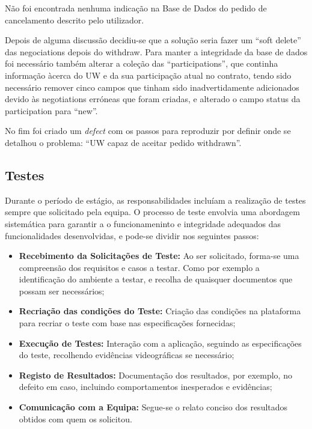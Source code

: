             Não foi encontrada nenhuma indicação na Base de Dados do pedido de cancelamento descrito pelo utilizador.

            Depois de alguma discussão decidiu-se que a solução seria fazer um ``soft delete'' das negociations depois do withdraw. Para manter a integridade da base de dados foi necessário também alterar a coleção das ``participations'', que continha informação àcerca do UW e da sua participação atual no contrato, tendo sido necessário remover cinco campos que tinham sido inadvertidamente adicionados devido às negotiations erróneas que foram criadas, e alterado o campo status da participation para ``new''.
            
            No fim foi criado um \textit{defect} com os passos para reproduzir por definir onde se detalhou o problema: ``UW capaz de aceitar pedido withdrawn''.



    \subsection{Testes}\label{sub:tests}

        Durante o período de estágio, as responsabilidades incluíam a realização de testes sempre que solicitado pela equipa. O processo de teste envolvia uma abordagem sistemática para garantir a o funcionameninto e integridade adequados das funcionalidades desenvolvidas, e pode-se dividir nos seguintes passos:
        
        \begin{itemize}
            \item \textbf{Recebimento da Solicitações de Teste:} Ao ser solicitado, forma-se uma compreensão dos requisitos e casos a testar. Como por exemplo a identificação do ambiente a testar, e recolha de quaisquer documentos que possam ser necessários;
            \item \textbf{Recriação das condições do Teste:} Criação das condições na plataforma para recriar o teste com base nas especificações fornecidas;
            \item \textbf{Execução de Testes:} Interação com a aplicação, seguindo as especificações do teste, recolhendo evidências videográficas se necessário;
            \item \textbf{Registo de Resultados:} Documentação dos resultados, por exemplo, no defeito em caso, incluindo comportamentos inesperados e evidências;
            \item \textbf{Comunicação com a Equipa:} Segue-se o relato conciso dos resultados obtidos com quem os solicitou.
        \end{itemize}

